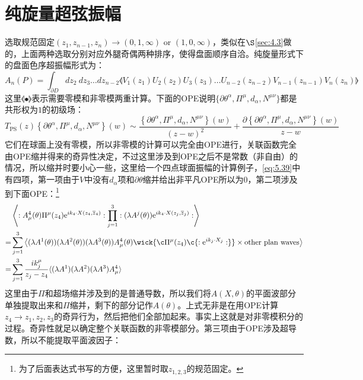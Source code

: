 \section{纯旋量超弦振幅}
\label{sec:5.4}
选取规范固定$(z_1,z_{n-1},z_n)\to(0,1,\infty)\text{ or }(1,0,\infty)$，类似在$\S$\ref{sec:4.3}做的，上面两种选取分别对应外腿奇偶两种排序，使得盘面顺序自洽。纯旋量形式下的盘面色序超振幅形式为：
\begin{equation}
	A_n(P)=\int_{\partial D}dz_2\mathrm{~}dz_3\ldots dz_{n-2}\llangle V_1(z_1)U_2(z_2)U_3(z_3)\ldots U_{n-2}(z_{n-2})V_{n-1}(z_{n-1})V_n(z_n)\rrangle
\end{equation}
这里$\llangle\bullet\rrangle$表示需要零模和非零模两重计算。下面的OPE说明$\{ \partial\theta^\alpha, \Pi^\mu,d_\alpha, N^{\mu\nu} \}$都是共形权为$1$的初级场：
\begin{equation}
	T_{\mathrm{PS}}(z) \left\{ \partial\theta^{\alpha}, \Pi^{\mu}, d_{\alpha}, N^{\mu\nu} \right\}(w) \sim \frac{\left\{ \partial\theta^{\alpha}, \Pi^{\mu}, d_{\alpha}, N^{\mu\nu} \right\}(w)}{(z-w)^{2}} + \frac{\partial \left\{ \partial\theta^{\alpha}, \Pi^{\mu}, d_{\alpha}, N^{\mu\nu} \right\}(w)}{z-w}
\end{equation}
它们在球面上没有零模，所以非零模的计算可以完全由OPE进行，关联函数完全由OPE缩并得来的奇异性决定\cite{Berkovits:2004px}，不过这里涉及到OPE之后不是常数（非自由）的情况，所以缩并时要小心一些，这里给一个四点球面振幅的计算例子，\ref{eq:5.39}中有四项，第一项由于$V$中没有$d_\alpha$项和$\partial\theta$缩并给出非平凡OPE所以为$0$，第二项涉及到下面OPE：\footnote{为了后面表达式书写的方便，这里暂时取$z_{1,2,3}$的规范固定。}
\begin{equation}
	\begin{aligned}
		&\left\langle :A_\mu^4(\theta)\Pi^\mu(z_4)\mathrm{e}^{ik_4\cdot X(z_4,\overline{z}_4)}:\prod_{j=1}^3:(\lambda A^j(\theta))\mathrm{e}^{ik_4\cdot X(z_j,\overline{z}_j)}:\right\rangle\\
		=&\sum_{j=1}^3\left\langle(\lambda A^1(\theta))(\lambda A^2(\theta))(\lambda A^3(\theta))A_\mu^4(\theta)\wick{\c\Pi^\mu(z_4)\c{:\mathrm{e}^{ik_j\cdot X_j}:}}\times \text{other plan waves}\right\rangle\\
		=& \sum_{j=1}^3\frac{ik_j^\mu}{z_j-z_4}\langle(\lambda A^1)(\lambda A^2)(\lambda A^3)A_\mu^4\rangle
	\end{aligned}
\end{equation}
这里由于$\Pi$和超场缩并涉及到的是普通导数，所以我们将$A(X,\theta)$的平面波部分单独提取出来和$\Pi$缩并，剩下的部分记作$A(\theta)$。上式无非是在用OPE计算$z_4\to z_1,z_2,z_3$的奇异行为，然后把他们全部加起来。事实上这就是对非零模积分的过程。奇异性就足以确定整个关联函数的非零模部分。第三项由于OPE涉及超导数，所以不能提取平面波因子：

